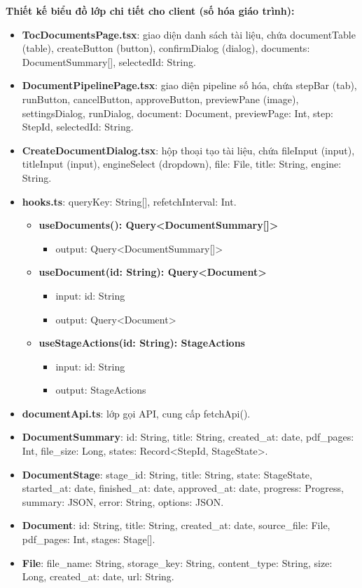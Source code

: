 \textbf{Thiết kế biểu đồ lớp chi tiết cho client (số hóa giáo trình):}
\begin{itemize}[label=\textbullet, itemsep=0.4em]
  \item \textbf{TocDocumentsPage.tsx}: giao diện danh sách tài liệu, chứa documentTable (table), createButton (button), confirmDialog (dialog), documents: DocumentSummary[], selectedId: String.
  \item \textbf{DocumentPipelinePage.tsx}: giao diện pipeline số hóa, chứa stepBar (tab), runButton, cancelButton, approveButton, previewPane (image), settingsDialog, runDialog, document: Document, previewPage: Int, step: StepId, selectedId: String.
  \item \textbf{CreateDocumentDialog.tsx}: hộp thoại tạo tài liệu, chứa fileInput (input), titleInput (input), engineSelect (dropdown), file: File, title: String, engine: String.
  \item \textbf{hooks.ts}: queryKey: String[], refetchInterval: Int.
  \begin{itemize}[label=$\circ$, itemsep=0.2em, leftmargin=1.5em]
    \item \textbf{useDocuments(): Query<DocumentSummary[]>}
    \begin{itemize}[label=$\blacksquare$, itemsep=0.1em, leftmargin=1.5em]
      \item output: Query<DocumentSummary[]>
    \end{itemize}
    \item \textbf{useDocument(id: String): Query<Document>}
    \begin{itemize}[label=$\blacksquare$, itemsep=0.1em, leftmargin=1.5em]
      \item input: id: String
      \item output: Query<Document>
    \end{itemize}
    \item \textbf{useStageActions(id: String): StageActions}
    \begin{itemize}[label=$\blacksquare$, itemsep=0.1em, leftmargin=1.5em]
      \item input: id: String
      \item output: StageActions
    \end{itemize}
  \end{itemize}
  \item \textbf{documentApi.ts}: lớp gọi API, cung cấp fetchApi().
  \item \textbf{DocumentSummary}: id: String, title: String, created\_at: date, pdf\_pages: Int, file\_size: Long, states: Record<StepId, StageState>.
  \item \textbf{DocumentStage}: stage\_id: String, title: String, state: StageState, started\_at: date, finished\_at: date, approved\_at: date, progress: Progress, summary: JSON, error: String, options: JSON.
  \item \textbf{Document}: id: String, title: String, created\_at: date, source\_file: File, pdf\_pages: Int, stages: Stage[].
  \item \textbf{File}: file\_name: String, storage\_key: String, content\_type: String, size: Long, created\_at: date, url: String.
\end{itemize}

